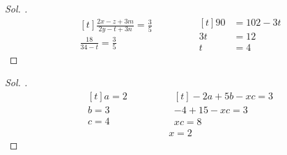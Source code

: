 \documentclass{article}
\theoremstyle{mytheoremstyle}
\theoremstyle{mytheoremstyle}
\theoremstyle{myproblemstyle}
\begin{document}
\begin{proof}[\textit{ Sol. }]
  \begin{equation*}
    \begin{aligned}[t]
      \frac{2x - z + 3m}{2y - t + 3n} = \frac{3}{5}\\
      \frac{18}{34 - t} = \frac{3}{5}
    \end{aligned}
    \qquad\qquad
    \begin{aligned}[t]
      90 &= 102 - 3t\\
      3t &= 12\\
      t &= 4
    \end{aligned}
  \end{equation*}
\end{proof}

\begin{problem}[$ \frac{a}{2} = \frac{b}{3} = \frac{c}{4} = \frac{-2a + 5b - xc}{3} $ işleminde $ x = ? $]
\end{problem}

\begin{proof}[\textit{ Sol. }]
  \begin{equation*}
    \begin{aligned}[t]
      a = 2\\
      b = 3\\
      c = 4
    \end{aligned}
    \qquad\qquad
    \begin{aligned}[t]
      -2a + 5b -xc = 3\\
      -4 + 15 - xc = 3\\
      xc = 8
    \end{aligned}
  \end{equation*}
  \begin{align*}
    x = 2
  \end{align*}
\end{proof}
\end{document}
